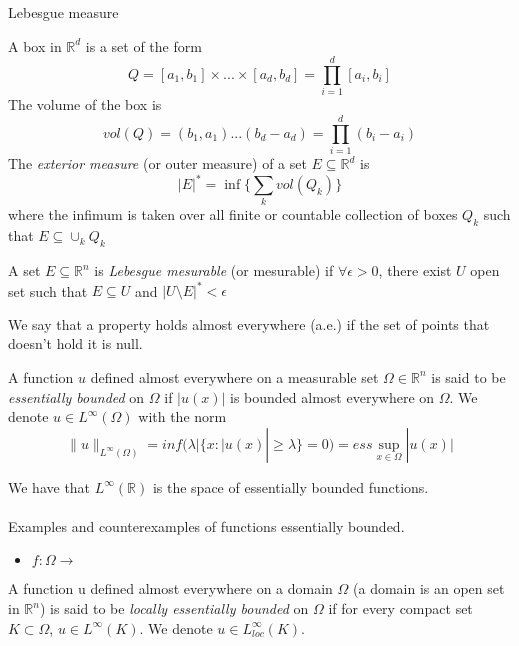 \documentclass[../main.tex]{subfiles}
\begin{document}
\noindent Lebesgue measure

\begin{definition} A box in $\mathbb{R}^d$ is a set of the form 
	$$ Q = [a_1,b_1]  \times ... \times [a_d,b_d] = \prod_{i=1}^d [a_i,b_i]$$
	The volume of the box is $$ vol(Q)= (b_1,a_1) ... (b_d-a_d)= \prod_{i=1}^d (b_i-a_i)$$
	The \emph{exterior measure} (or outer measure) of a set $E\subseteq \mathbb{R}^d$ is $$ |E|^* = \inf\{\sum_k vol(Q_k)\} $$ 
	where the infimum is taken over all finite or countable collection of boxes $Q_k$ such that $E \subseteq \cup_k Q_k$
\end{definition}

\begin{definition}
A set $E\subseteq \mathbb{R}^n $ is \emph{Lebesgue mesurable} (or mesurable) if $\forall \epsilon >0$, there exist $U$ open set such that $E \subseteq U$ and $|U\setminus E|^* < \epsilon $
\end{definition}

\begin{definition}
	We say that a property holds almost everywhere (a.e.) if the set of points that doesn’t hold it is null.
\end{definition}
\begin{definition}
	A function $u$ defined almost everywhere on a measurable set $\Omega \in \mathbb{R}^n$ is said to be \emph{essentially bounded} on $\Omega$ if $|u(x)|$ is bounded almost everywhere on $\Omega$. We denote $u\in L^{\infty}(\Omega)$ with the norm $$\|u\|_{L^{\infty}(\Omega)}= inf(\lambda | \{ x : |u(x)| \geq \lambda \} = 0 ) = ess \sup_{x\in \Omega} |u(x)|$$

\end{definition}

\noindent We have that $L^{\infty}(\mathbb{R})$ is the space of essentially bounded functions.
\\ \\ 
Examples and counterexamples of functions essentially bounded. 
\begin{itemize}
\item $f:\Omega \rightarrow $
\end{itemize}

\begin{definition}
	A function u defined almost everywhere on a domain $\Omega$ (a domain is an open set in $\mathbb{R}^n$) is said to be\emph{ locally essentially bounded }on $\Omega$ if for every compact set $K\subset \Omega$, $u\in L^{\infty}(K)$. We denote $u\in L_{loc}^{\infty}(K)$.
\end{definition}
\end{document}
